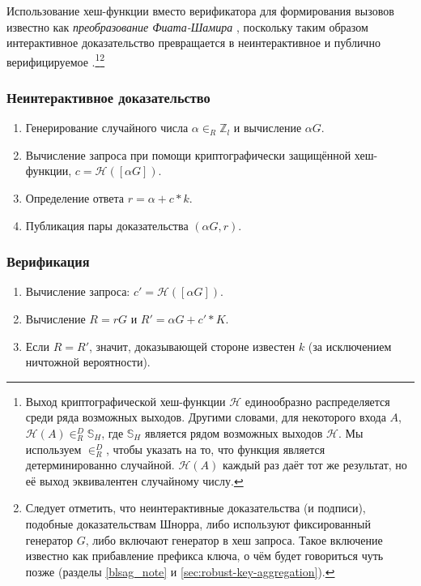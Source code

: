 Использование хеш-функции вместо верификатора для формирования вызовов известно как {\em преобразование Фиата-Шамира} \cite{fiat-shamir-transform}, поскольку таким образом интерактивное доказательство превращается в неинтерактивное и публично верифицируемое \cite{Signatures2015BorromeanRS}.\footnote{Выход криптографической хеш-функции $\mathcal{H}$ единообразно распределяется среди ряда возможных выходов. Другими словами, для некоторого входа $A$, $\mathcal{H}(A) \in^D_R \mathbb{S}_H$, где $\mathbb{S}_H$ является рядом возможных выходов $\mathcal{H}$. Мы используем $\in^D_R$, чтобы указать на то, что функция является детерминированно случайной. $\mathcal{H}(A)$ каждый раз даёт тот же результат, но её выход эквивалентен случайному числу.
}\footnote{Следует отметить, что неинтерактивные доказательства (и подписи), подобные доказательствам Шнорра, либо используют фиксированный генератор $G$, либо включают генератор в хеш запроса. Такое включение известно как прибавление префикса ключа, о чём будет говориться чуть позже (разделы \ref{blsag_note} и \ref{sec:robust-key-aggregation}).}

\subsubsection*{Неинтерактивное доказательство}

\begin{enumerate}
	\item Генерирование случайного числа $\alpha \in_R \mathbb{Z}_l$ и вычисление $\alpha G$.
	\item Вычисление запроса при помощи криптографически защищённой хеш-функции, \(c = \mathcal{H}([\alpha G])\).
	\item Определение ответа $r = \alpha + c*k$.
	\item Публикация пары доказательства $(\alpha G, r)$.
\end{enumerate}

\subsubsection*{Верификация}

\begin{enumerate}
	\item Вычисление запроса: \(c' = \mathcal{H}([\alpha G])\).
	\item Вычисление $R = r G$ и $R' = \alpha G + c'*K$.
	\item Если $R = R'$, значит, доказывающей стороне известен $k$ (за исключением ничтожной вероятности).
\end{enumerate}

